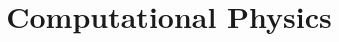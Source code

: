 
\usepackage{subcaption}

\title{Computational Physics}
\subject{Sheet10}


\maketitle


\newpage
\printbibliography{}


